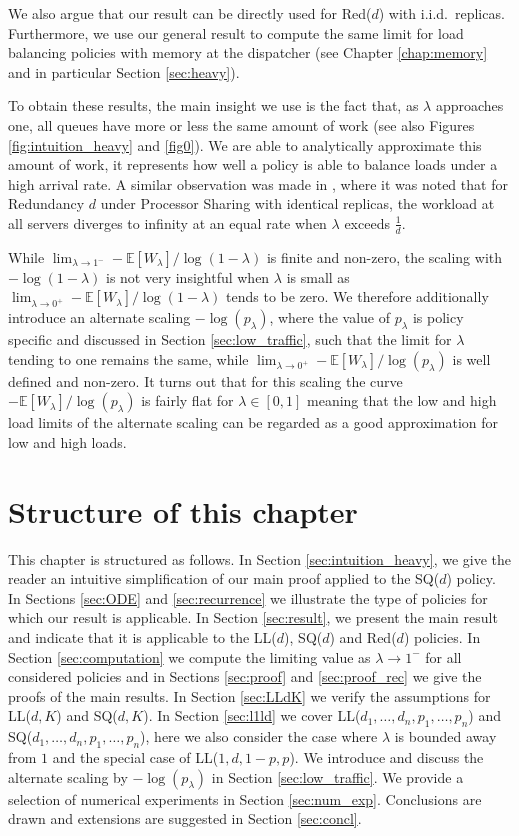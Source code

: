 \documentclass[12pt]{report}
\newcommand{\E}{\mathbb{E}}
\begin{document}
We also argue that our result can be directly used
for Red($d$) with i.i.d.~replicas. Furthermore, we use our general result to compute the same limit for load balancing policies with memory at the dispatcher (see Chapter \ref{chap:memory} and in particular Section \ref{sec:heavy}).

To obtain these results, the main insight we use is the fact that, as $\lambda$ approaches one, all queues have more or less the same amount of work (see also Figures \ref{fig:intuition_heavy} and \ref{fig0}). We are able to analytically approximate this amount of work, it represents how well a policy is able to balance loads under a high arrival rate. A similar observation was made in \cite{anton2019stability}, where it was noted that for Redundancy $d$ under Processor Sharing with identical replicas, the workload at all servers diverges to infinity at an equal rate when $\lambda$ exceeds $\frac{1}{d}$.

While $\lim_{\lambda\rightarrow 1^-}-\E[W_\lambda]/\log(1-\lambda)$ is finite and
non-zero, the scaling with $-\log(1-\lambda)$ is not very insightful when $\lambda$
is small as $\lim_{\lambda\rightarrow 0^+}-\E[W_\lambda]/\log(1-\lambda)$ tends to be zero.
We therefore additionally introduce an alternate scaling $-\log(p_\lambda)$, where
the value of $p_\lambda$ is policy specific and discussed in Section \ref{sec:low_traffic},
such that the limit for $\lambda$ tending to one remains the same, while\newline 
$\lim_{\lambda\rightarrow 0^+}-\E[W_\lambda]/\log(p_\lambda)$ is well defined
and non-zero. It turns out that for this scaling the curve $-\E[W_\lambda]/\log(p_\lambda)$
is fairly flat for $\lambda \in [0,1]$ meaning that the low and high load
limits of the alternate scaling can be regarded as a good approximation for low and high loads.

\section{Structure of this chapter}
This chapter is structured as follows. In Section \ref{sec:intuition_heavy}, we give the reader an intuitive simplification of our main proof applied to the SQ($d$) policy. In Sections \ref{sec:ODE} and \ref{sec:recurrence} we illustrate the type of policies for which our result is applicable. In Section \ref{sec:result}, we present the main result and indicate that it is applicable to the LL($d$), SQ($d$) and Red($d$) policies. In Section \ref{sec:computation} we compute the limiting value as $\lambda \rightarrow 1^-$ for all considered policies and in Sections \ref{sec:proof} and \ref{sec:proof_rec} we give the proofs of the main results. In Section \ref{sec:LLdK} we verify the assumptions for LL($d,K$) and SQ($d,K$). In Section \ref{sec:l1ld} we cover LL($d_1,\dots,d_n,p_1,\dots,p_n$) and SQ($d_1,\dots, d_n, p_1,\dots, p_n$), here we also consider the case where $\lambda$ is bounded away from $1$ and the special case of LL($1, d, 1-p, p$). We introduce and discuss the alternate scaling by $-\log(p_\lambda)$ in Section \ref{sec:low_traffic}. We provide a selection of numerical experiments in Section \ref{sec:num_exp}. Conclusions are drawn and extensions are suggested in Section \ref{sec:concl}.
\end{document}
